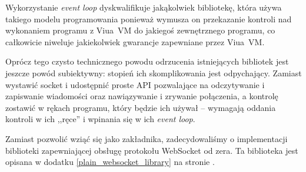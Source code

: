 Wykorzystanie \emph{event loop} dyskwalifikuje jakąkolwiek bibliotekę, która
używa takiego modelu programowania ponieważ wymusza on przekazanie kontroli nad
wykonaniem programu z Viua~VM do jakiegoś zewnętrznego programu, co całkowicie
niweluje jakiekolwiek gwarancje zapewniane przez Viua~VM.

Oprócz tego czysto technicznego powodu odrzucenia istniejących bibliotek jest
jeszcze powód subiektywny: stopień ich skomplikowania jest odpychający. Zamiast
wystawić socket i udostępnić proste API pozwalające na odczytywanie i zapiswanie
wiadomości oraz nawiązywanie i zrywanie połączenia, a kontrolę zostawić w rękach
programu, który będzie ich używał -- wymagają oddania kontroli w ich ,,ręce'' i
wpinania się w ich \emph{event loop}.

Zamiast pozwolić wziąć się jako zakładnika, zadecydowaliśmy o implementacji
biblioteki zapewniającej obsługę protokołu WebSocket od zera. Ta biblioteka jest
opisana w dodatku \ref{plain_websocket_library} na stronie
\pageref{plain_websocket_library}.
